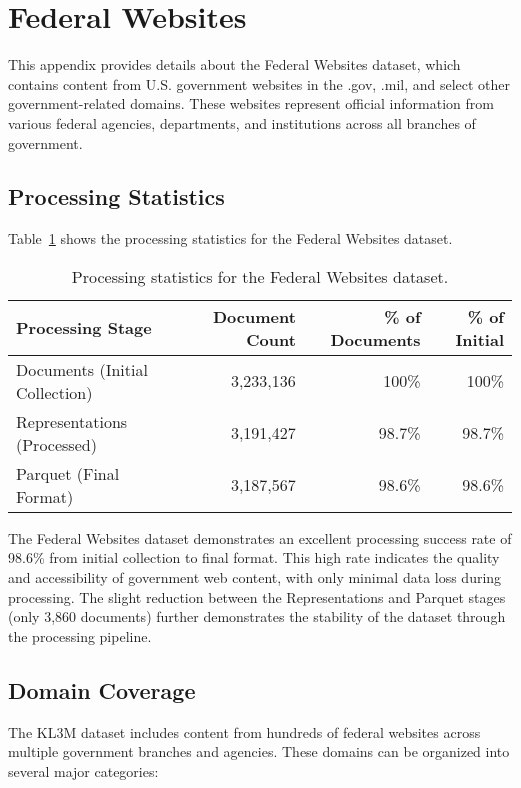 \section{Federal Websites}
\label{appendix:dotgov}

This appendix provides details about the Federal Websites dataset, which contains content from U.S. government websites in the .gov, .mil, and select other government-related domains. These websites represent official information from various federal agencies, departments, and institutions across all branches of government.

\subsection{Processing Statistics}

Table~\ref{table:dotgov-stats} shows the processing statistics for the Federal Websites dataset.

\begin{table}[h]
\centering
\begin{tabular}{|l|r|r|r|}
\hline
\textbf{Processing Stage} & \textbf{Document Count} & \textbf{\% of Documents} & \textbf{\% of Initial} \\
\hline
Documents (Initial Collection) & 3,233,136 & 100\% & 100\% \\
Representations (Processed) & 3,191,427 & 98.7\% & 98.7\% \\
Parquet (Final Format) & 3,187,567 & 98.6\% & 98.6\% \\
\hline
\end{tabular}
\caption{Processing statistics for the Federal Websites dataset.}
\label{table:dotgov-stats}
\end{table}

The Federal Websites dataset demonstrates an excellent processing success rate of 98.6\% from initial collection to final format. This high rate indicates the quality and accessibility of government web content, with only minimal data loss during processing. The slight reduction between the Representations and Parquet stages (only 3,860 documents) further demonstrates the stability of the dataset through the processing pipeline.

\subsection{Domain Coverage}

The KL3M dataset includes content from hundreds of federal websites across multiple government branches and agencies. These domains can be organized into several major categories:

